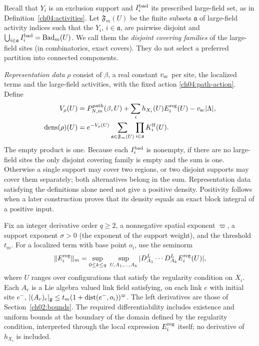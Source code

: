 Recall that $Y_i$ is an exclusion support and $I_i^{\rm bad}$ its prescribed large-field
set, as in Definition~\ref{ch04:activities}. Let
$\mathfrak F_m(U)$ be the finite subsets $\mathfrak a$ of large-field
activity indices such that the $Y_i$, $i\in\mathfrak a$, are pairwise
disjoint and
$\bigcup_{i\in\mathfrak a}I_i^{\rm bad}=\operatorname{Bad}_m(U)$.
We call them the \emph{disjoint covering families} of the large-field sites (in combinatorics, exact covers). They do not select a
preferred partition into connected components.

\emph{Representation data} $\rho$ consist of $\beta$, a real constant
$v_{\rm sc}$ per site, the localized terms and the large-field
activities, with the fixed action \eqref{ch04:path-action}. Define
\begin{align}
 V_\rho(U)&=P^{\rm path}_{N,m}(\beta,U)
                +\sum_i h_{X_i}(U)E_i^{\rm reg}(U)-v_{\rm sc}|\Lambda|,
 \notag\\
 \operatorname{dens}(\rho)(U)
   &=e^{-V_\rho(U)}
          \sum_{\mathfrak a\in\mathfrak F_m(U)}
                         \prod_{i\in\mathfrak a}K_i^{\rm lf}(U).
 \label{ch04:effective-density}
\end{align}
The empty product is one. Because each $I_i^{\rm bad}$ is nonempty, if
there are no large-field sites the only disjoint covering family is empty and the sum
is one. Otherwise a single support may cover two regions, or two disjoint
supports may cover them separately; both alternatives belong in the sum.
Representation data satisfying the definitions alone need not give a positive density.
Positivity follows when a later construction proves that its density equals
an exact block integral of a positive input.

Fix an integer derivative order $q\ge2$, a nonnegative spatial exponent
$\varpi$, a support exponent $\sigma>0$ (the exponent of the support weight), and the threshold $t_m$.
For a localized term with base point $o_i$, use the seminorm
\begin{equation}
 \|E_i^{\rm reg}\|_m
 =\sup_{0\le k\le q}\ \sup_{U,A_1,\ldots,A_k}
        |D_{A_1}^L\cdots D_{A_k}^L E_i^{\rm reg}(U)|,
 \label{ch04:local-seminorm}
\end{equation}
where $U$ ranges over configurations that satisfy the regularity condition on $X_i$.
Each $A_r$ is a Lie algebra valued link field satisfying, on each link $e$ with initial site $e^-$,
$|(A_r)_e|_{\mathfrak g}\le t_m(1+\operatorname{dist}(e^-,o_i))^\varpi$.
The left derivatives are those of Section~\ref{ch02:bounds}. The required
differentiability includes existence and uniform bounds at the boundary of the
domain defined by the regularity condition, interpreted through the local expression $E_i^{\rm reg}$ itself;
no derivative of $h_{X_i}$ is included.

